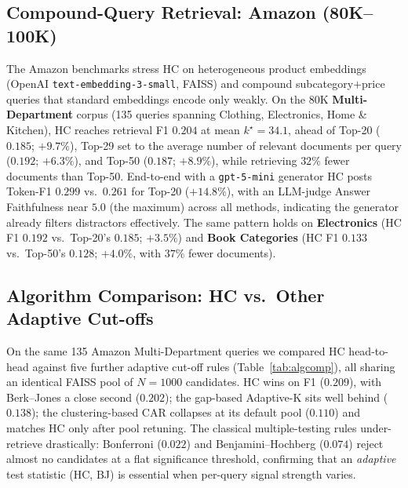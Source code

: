 \documentclass[letterpaper]{article}
\newcommand{\AmMdHCF}{0.204}
\newcommand{\AmMdHCK}{34.1}
\newcommand{\AmMdTwentyF}{0.185}
\newcommand{\AmMdAvgF}{0.192}
\newcommand{\AmMdFiftyF}{0.187}
\newcommand{\AmMdHCTokF}{0.299}
\newcommand{\AmMdTwentyTokF}{0.261}
\newcommand{\AmElHCF}{0.192}
\newcommand{\AmElTwentyF}{0.185}
\newcommand{\AmBkHCF}{0.133}
\newcommand{\AmBkFiftyF}{0.128}
\newcommand{\AlgHCF}{0.209}
\newcommand{\AlgBJF}{0.202}
\newcommand{\AlgBonfF}{0.022}
\newcommand{\AlgBHF}{0.074}
\newcommand{\AlgAdaKF}{0.138}
\newcommand{\AlgCARF}{0.110}
\begin{document}
\subsection{Compound-Query Retrieval: Amazon (80K--100K)}
\label{sec:amazon}
The Amazon benchmarks stress HC on heterogeneous product
embeddings (OpenAI \texttt{text-embedding-3-small}, FAISS) and
compound subcategory$+$price queries that standard embeddings
encode only weakly. On the 80K \textbf{Multi-Department} corpus
(135 queries spanning Clothing, Electronics, Home \& Kitchen), HC
reaches retrieval F1 $\AmMdHCF$ at mean $k^\star = \AmMdHCK$,
ahead of Top-20 ($\AmMdTwentyF$; $+9.7\%$), Top-29 set to the
average number of relevant documents per query ($\AmMdAvgF$;
$+6.3\%$), and Top-50 ($\AmMdFiftyF$; $+8.9\%$), while retrieving
$32\%$ fewer documents than Top-50. End-to-end with a
\texttt{gpt-5-mini} generator HC posts Token-F1 $\AmMdHCTokF$
vs.\ $\AmMdTwentyTokF$ for Top-20 ($+14.8\%$), with an LLM-judge
Answer Faithfulness near $5.0$ (the maximum) across all methods,
indicating the generator already filters distractors effectively.
The same pattern holds on \textbf{Electronics} (HC F1 $\AmElHCF$
vs.\ Top-20's $\AmElTwentyF$; $+3.5\%$) and \textbf{Book
Categories} (HC F1 $\AmBkHCF$ vs.\ Top-50's $\AmBkFiftyF$;
$+4.0\%$, with $37\%$ fewer documents).

\subsection{Algorithm Comparison: HC vs.\ Other Adaptive Cut-offs}
\label{sec:algcomp}
On the same 135 Amazon Multi-Department queries we compared HC
head-to-head against five further adaptive cut-off rules
(Table~\ref{tab:algcomp}), all sharing an identical FAISS pool of
$N{=}1000$ candidates. HC wins on F1 ($\AlgHCF$), with
Berk--Jones a close second ($\AlgBJF$); the gap-based Adaptive-K
\cite{adaptivek2025} sits well behind ($\AlgAdaKF$); the
clustering-based CAR \cite{xu2025car} collapses at its default
pool ($\AlgCARF$) and matches HC only after pool retuning. The
classical multiple-testing rules under-retrieve drastically:
Bonferroni ($\AlgBonfF$) and Benjamini--Hochberg ($\AlgBHF$)
reject almost no candidates at a flat significance threshold,
confirming that an \emph{adaptive} test statistic (HC, BJ) is
essential when per-query signal strength varies.
\end{document}

